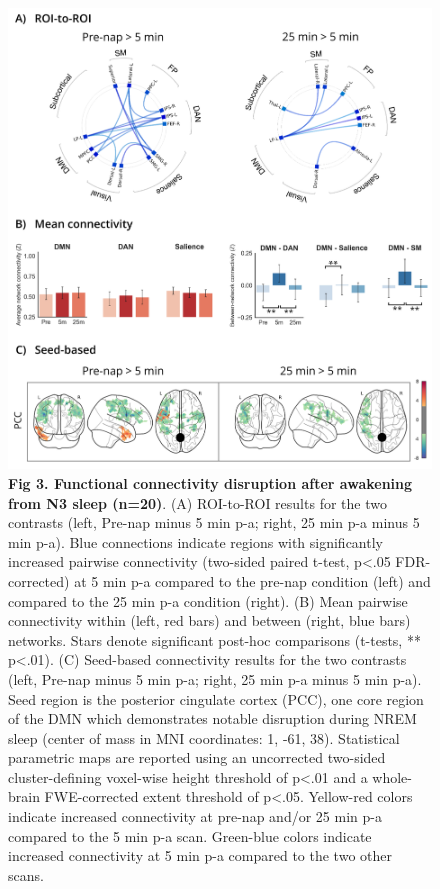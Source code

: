 \begin{figure}[htb!]
	\includegraphics[width=\textwidth]{Fig/Results/Inertia/Inertia/Fig3_N3.png}
	\caption*{\textbf{Fig 3. Functional connectivity disruption after awakening from N3 sleep (n=20)}. (A) ROI-to-ROI results for the two contrasts (left, Pre-nap minus 5 min p-a; right, 25 min p-a minus 5 min p-a). Blue connections indicate regions with significantly increased pairwise connectivity (two-sided paired t-test, p<.05 FDR-corrected) at 5 min p-a compared to the pre-nap condition (left) and compared to the 25 min p-a condition (right). (B) Mean pairwise connectivity within (left, red bars) and between (right, blue bars) networks. Stars denote significant post-hoc comparisons (t-tests, ** p<.01). (C) Seed-based connectivity results for the two contrasts (left, Pre-nap minus 5 min p-a; right, 25 min p-a minus 5 min p-a). Seed region is the posterior cingulate cortex (PCC), one core region of the DMN which demonstrates notable disruption during NREM sleep (center of mass in MNI coordinates: 1, -61, 38). Statistical parametric maps are reported using an uncorrected two-sided cluster-defining voxel-wise height threshold of p<.01 and a whole-brain FWE-corrected extent threshold of p<.05. Yellow-red colors indicate increased connectivity at pre-nap and/or 25 min p-a compared to the 5 min p-a scan. Green-blue colors indicate increased connectivity at 5 min p-a compared to the two other scans.}
\end{figure}

